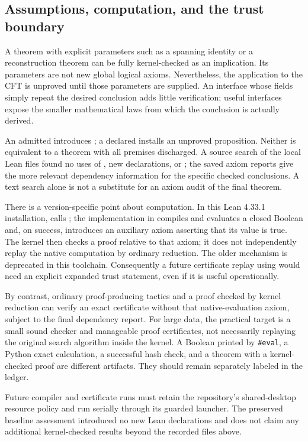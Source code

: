\subsection{Assumptions, computation, and the trust boundary}

A theorem with explicit parameters such as a spanning identity or a
reconstruction theorem can be fully kernel-checked as an implication.
Its parameters are not new global logical axioms. Nevertheless, the
application to the CFT is unproved until those parameters are supplied.
An interface whose fields simply repeat the desired conclusion adds
little verification; useful interfaces expose the smaller mathematical
laws from which the conclusion is actually derived.

An admitted  introduces ; a declared
 installs an unproved proposition. Neither is equivalent
to a theorem with all premises discharged. A source search of the local
 Lean files found no uses of ,
new  declarations, or ; the saved
axiom reports give the more relevant dependency information for the
specific checked conclusions. A text search alone is not a substitute
for an axiom audit of the final theorem.

There is a version-specific point about computation. In this Lean
4.33.1 installation,  calls
; the implementation in
 compiles and evaluates a closed Boolean
and, on success, introduces an auxiliary axiom asserting that its value
is true. The kernel then checks a proof relative to that axiom; it does
not independently replay the native computation by ordinary reduction.
The older  mechanism is deprecated in this
toolchain. Consequently a future certificate replay using
 would need an explicit expanded trust statement,
even if it is useful operationally.

By contrast, ordinary proof-producing tactics and a 
proof checked by kernel reduction can verify an exact certificate
without that native-evaluation axiom, subject to the final dependency
report. For large data, the practical target is a small sound checker
and manageable proof certificates, not necessarily replaying the
original search algorithm inside the kernel. A Boolean printed by
\texttt{\#eval}, a Python exact calculation, a successful hash check,
and a theorem with a kernel-checked proof are different artifacts.
They should remain separately labeled in the ledger.

Future compiler and certificate runs must retain the repository's
shared-desktop resource policy and run serially through its guarded
launcher. The preserved baseline assessment introduced no new Lean declarations and
does not claim any additional kernel-checked results beyond the
recorded files above.
